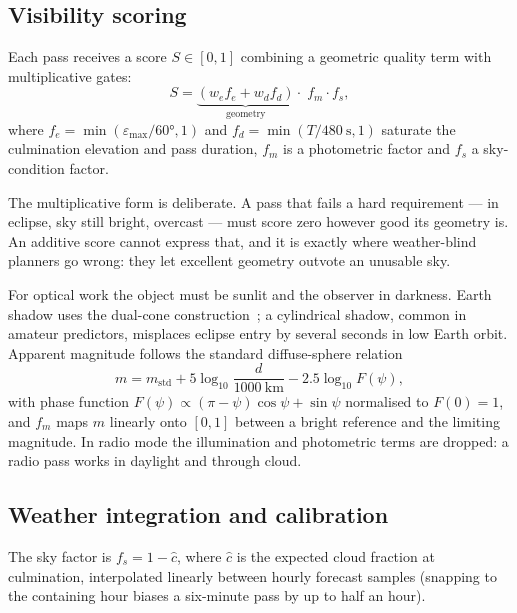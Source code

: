 \documentclass[conference]{IEEEtran}
\begin{document}
\subsection{Visibility scoring}
Each pass receives a score $S \in [0,1]$ combining a geometric quality term with
multiplicative gates:
\begin{equation}
S = \underbrace{\left(w_e f_e + w_d f_d\right)}_{\text{geometry}}
    \cdot \; f_m \cdot f_s ,
\label{eq:score}
\end{equation}
where $f_e = \min(\varepsilon_\mathrm{max}/\ang{60},1)$ and
$f_d = \min(T/\SI{480}{\second},1)$ saturate the culmination elevation and pass
duration, $f_m$ is a photometric factor and $f_s$ a sky-condition factor.

The multiplicative form is deliberate. A pass that fails a hard requirement ---
in eclipse, sky still bright, overcast --- must score zero however good its
geometry is. An additive score cannot express that, and it is exactly where
weather-blind planners go wrong: they let excellent geometry outvote an
unusable sky.

For optical work the object must be sunlit and the observer in darkness. Earth
shadow uses the dual-cone construction~\cite{vallado2022fundamentals}; a
cylindrical shadow, common in amateur predictors, misplaces eclipse entry by
several seconds in low Earth orbit. Apparent magnitude follows the standard
diffuse-sphere relation~\cite{fankhauser2023brightness, mccants}
\begin{equation}
m = m_\mathrm{std} + 5\log_{10}\!\frac{d}{\SI{1000}{\kilo\metre}}
    - 2.5\log_{10} F(\psi),
\label{eq:mag}
\end{equation}
with phase function
$F(\psi) \propto (\pi-\psi)\cos\psi + \sin\psi$ normalised to $F(0)=1$, and
$f_m$ maps $m$ linearly onto $[0,1]$ between a bright reference and the limiting
magnitude. In radio mode the illumination and photometric terms are dropped: a
radio pass works in daylight and through cloud.

\subsection{Weather integration and calibration}
\label{sec:calib}
The sky factor is $f_s = 1 - \hat{c}$, where $\hat{c}$ is the expected cloud
fraction at culmination, interpolated linearly between hourly forecast samples
(snapping to the containing hour biases a six-minute pass by up to half an hour).
\end{document}
